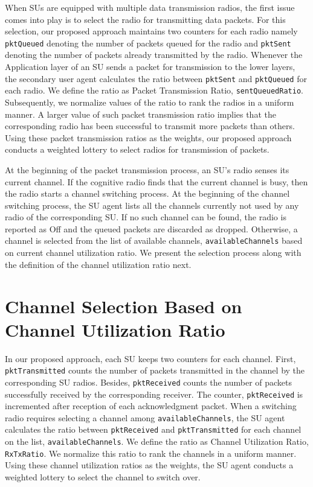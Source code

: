 When SUs are equipped with multiple data transmission radios, the first issue comes into play is to select the radio for transmitting data packets. For this selection, our proposed approach maintains two counters for each radio namely \texttt{pktQueued} denoting the number of packets queued for the radio and \texttt{pktSent} denoting the number of packets already transmitted by the radio. Whenever the Application layer of an SU sends a packet for transmission to the lower layers, the secondary user agent calculates the ratio between 	\texttt{pktSent} and \texttt{pktQueued} for each radio. We define the ratio as Packet Transmission Ratio, \texttt{sentQueuedRatio}. Subsequently, we normalize values of the ratio to rank the radios in a uniform manner. A larger value of such packet transmission ratio implies that the corresponding radio has been successful to transmit more packets than others. Using these packet transmission ratios as the weights, our proposed approach conducts a weighted lottery to select radios for transmission of packets.

At the beginning of the packet transmission process, an SU's radio senses its current channel. If the cognitive radio finds that the current channel is busy, then the radio starts a channel switching process. At the beginning of the channel switching process, the SU agent lists all the channels currently not used by any radio of the corresponding SU. If no such channel can be found, the radio is reported as Off and the queued packets are discarded as dropped. Otherwise, a channel is selected from the list of available channels, \texttt{availableChannels} based on current channel utilization ratio. We present the selection process along with the definition of the channel utilization ratio next.

\section{Channel Selection Based on Channel Utilization Ratio}
\label{sec:channelSelect}

In our proposed approach, each SU keeps two counters for each channel. First, \texttt{pktTransmitted} counts the number of packets transmitted in the channel by the corresponding SU radios. Besides, \texttt{pktReceived} counts the number of packets successfully received by the corresponding receiver. The counter, \texttt{pktReceived} is incremented after reception of each acknowledgment packet. When a switching radio requires selecting a channel among \texttt{availableChannels}, the SU agent calculates the ratio between \texttt{pktReceived} and \texttt{pktTransmitted} for each channel on the list, \texttt{availableChannels}. We define the ratio as Channel Utilization Ratio, \texttt{RxTxRatio}. We normalize this ratio to rank the channels in a uniform manner. Using these channel utilization ratios as the weights, the SU agent conducts a weighted lottery to select the channel to switch over.

